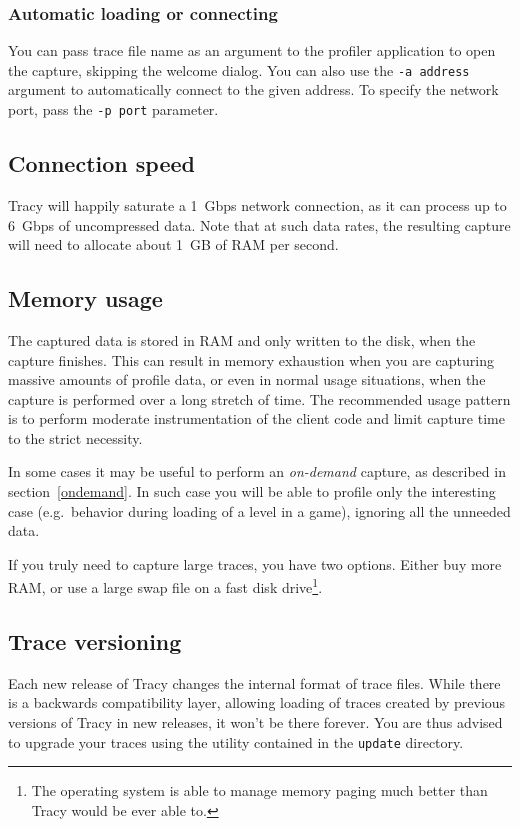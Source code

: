 \documentclass[hidelinks,titlepage,a4paper]{article}
\begin{document}
\subsubsection{Automatic loading or connecting}

You can pass trace file name as an argument to the profiler application to open the capture, skipping the welcome dialog. You can also use the \texttt{-a address} argument to automatically connect to the given address. To specify the network port, pass the \texttt{-p port} parameter.

\subsection{Connection speed}

Tracy will happily saturate a 1~Gbps network connection, as it can process up to 6~Gbps of uncompressed data. Note that at such data rates, the resulting capture will need to allocate about 1~GB of RAM per second.

\subsection{Memory usage}

The captured data is stored in RAM and only written to the disk, when the capture finishes. This can result in memory exhaustion when you are capturing massive amounts of profile data, or even in normal usage situations, when the capture is performed over a long stretch of time. The recommended usage pattern is to perform moderate instrumentation of the client code and limit capture time to the strict necessity.

In some cases it may be useful to perform an \emph{on-demand} capture, as described in section~\ref{ondemand}. In such case you will be able to profile only the interesting case (e.g.\ behavior during loading of a level in a game), ignoring all the unneeded data.

If you truly need to capture large traces, you have two options. Either buy more RAM, or use a large swap file on a fast disk drive\footnote{The operating system is able to manage memory paging much better than Tracy would be ever able to.}.

\subsection{Trace versioning}

Each new release of Tracy changes the internal format of trace files. While there is a backwards compatibility layer, allowing loading of traces created by previous versions of Tracy in new releases, it won't be there forever. You are thus advised to upgrade your traces using the utility contained in the \texttt{update} directory.
\end{document}
